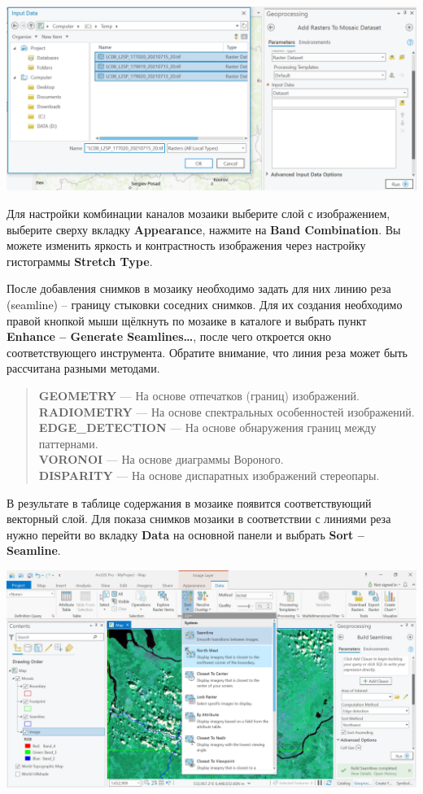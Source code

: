 \documentclass[
  12pt,
]{book}
\begin{document}
\includegraphics{images/Ref03/Raster_Dataset.png}

Для настройки комбинации каналов мозаики выберите слой с изображением, выберите сверху вкладку \textbf{Appearance}, нажмите на \textbf{Band Combination}. Вы можете изменить яркость и контрастность изображения через настройку гистограммы \textbf{Stretch Type}.

После добавления снимков в мозаику необходимо задать для них линию реза (seamline) -- границу стыковки соседних снимков. Для их создания необходимо правой кнопкой мыши щёлкнуть по мозаике в каталоге и выбрать пункт \textbf{Enhance -- Generate Seamlines\ldots{}}, после чего откроется окно соответствующего инструмента. Обратите внимание, что линия реза может быть рассчитана разными методами.

\begin{quote}
\textbf{GEOMETRY} --- На основе отпечатков (границ) изображений.\\
\textbf{RADIOMETRY} --- На основе спектральных особенностей изображений.\\
\textbf{EDGE\_DETECTION} --- На основе обнаружения границ между паттернами.\\
\textbf{VORONOI} --- На основе диаграммы Вороного.\\
\textbf{DISPARITY} --- На основе диспаратных изображений стереопары.
\end{quote}

В результате в таблице содержания в мозаике появится соответствующий векторный слой. Для показа снимков мозаики в соответствии с линиями реза нужно перейти во вкладку \textbf{Data} на основной панели и выбрать \textbf{Sort -- Seamline}.

\includegraphics{images/Ref03/Sort.png}
\end{document}
